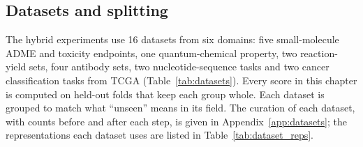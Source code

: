 

\subsection{Datasets and splitting}

The hybrid experiments use 16 datasets from six domains: five small-molecule ADME and toxicity endpoints, one quantum-chemical property, two reaction-yield sets, four antibody sets, two nucleotide-sequence tasks and two cancer classification tasks from TCGA (Table~\ref{tab:datasets}). Every score in this chapter is computed on held-out folds that keep each group whole. Each dataset is grouped to match what ``unseen'' means in its field. The curation of each dataset, with counts before and after each step, is given in Appendix~\ref{app:datasets}; the representations each dataset uses are listed in Table~\ref{tab:dataset_reps}.

